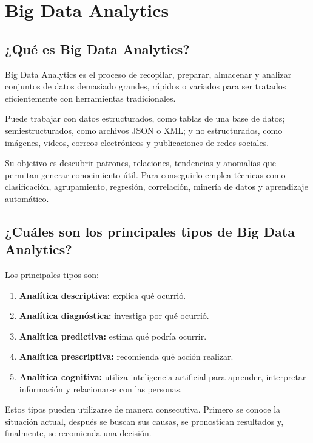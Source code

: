 
\section{Big Data Analytics}

\subsection{¿Qué es Big Data Analytics?}

Big Data Analytics es el proceso de recopilar, preparar, almacenar y analizar
conjuntos de datos demasiado grandes, rápidos o variados para ser tratados
eficientemente con herramientas tradicionales.

Puede trabajar con datos estructurados, como tablas de una base de datos;
semiestructurados, como archivos JSON o XML; y no estructurados, como
imágenes, videos, correos electrónicos y publicaciones de redes sociales.

Su objetivo es descubrir patrones, relaciones, tendencias y anomalías que
permitan generar conocimiento útil. Para conseguirlo emplea técnicas como
clasificación, agrupamiento, regresión, correlación, minería de datos y
aprendizaje automático.

\subsection{¿Cuáles son los principales tipos de Big Data Analytics?}

Los principales tipos son:

\begin{enumerate}
    \item \textbf{Analítica descriptiva:} explica qué ocurrió.
    \item \textbf{Analítica diagnóstica:} investiga por qué ocurrió.
    \item \textbf{Analítica predictiva:} estima qué podría ocurrir.
    \item \textbf{Analítica prescriptiva:} recomienda qué acción realizar.
    \item \textbf{Analítica cognitiva:} utiliza inteligencia artificial para
    aprender, interpretar información y relacionarse con las personas.
\end{enumerate}

Estos tipos pueden utilizarse de manera consecutiva. Primero se conoce la
situación actual, después se buscan sus causas, se pronostican resultados y,
finalmente, se recomienda una decisión.

